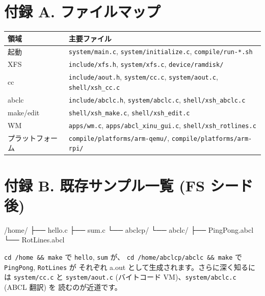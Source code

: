 \documentclass[a4paper,11pt]{ltjsarticle}
\begin{document}
\section*{付録 A. ファイルマップ}
\begin{center}\footnotesize
\begin{tabular}{@{}l p{9.0cm}@{}}
\toprule \textbf{領域} & \textbf{主要ファイル}\\ \midrule
起動 & \verb|system/main.c|, \verb|system/initialize.c|, \verb|compile/run-*.sh|\\
XFS  & \verb|include/xfs.h|, \verb|system/xfs.c|, \verb|device/ramdisk/|\\
cc   & \verb|include/aout.h|, \verb|system/cc.c|, \verb|system/aout.c|, \verb|shell/xsh_cc.c|\\
abclc& \verb|include/abclc.h|, \verb|system/abclc.c|, \verb|shell/xsh_abclc.c|\\
make/edit & \verb|shell/xsh_make.c|, \verb|shell/xsh_edit.c|\\
WM   & \verb|apps/wm.c|, \verb|apps/abcl_xinu_gui.c|, \verb|shell/xsh_rotlines.c|\\
プラットフォーム & \verb|compile/platforms/arm-qemu/|, \verb|compile/platforms/arm-rpi/|\\
\bottomrule
\end{tabular}
\end{center}

\section*{付録 B. 既存サンプル一覧 (FS シード後)}
\begin{code}
/home/
├── hello.c
├── sum.c
└── abclcp/
    └── abclc/
        ├── PingPong.abcl
        └── RotLines.abcl
\end{code}
\verb|cd /home && make| で \verb|hello|, \verb|sum| が、
\verb|cd /home/abclcp/abclc && make| で \verb|PingPong|, \verb|RotLines| が
それぞれ a.out として生成されます。さらに深く知るには \verb|system/cc.c| と
\verb|system/aout.c| (バイトコード VM)、\verb|system/abclc.c| (ABCL 翻訳) を
読むのが近道です。
\end{document}
